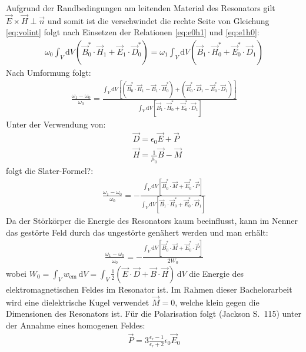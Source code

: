 \documentclass[11pt, a4paper]{scrbook}
\newcommand{\ve}{\vec{E}}
\newcommand{\vb}{\vec{B}}
\newcommand{\vh}{\vec{H}}
\newcommand{\vd}{\vec{D}}
\begin{document}
	Aufgrund der Randbedingungen am leitenden Material des Resonators gilt $\ve \times \vh \perp \vec{n}$ und somit ist die verschwindet die rechte Seite von Gleichung \eqref{eq:volint} folgt nach Einsetzen der Relationen \eqref{eq:e0h1} und \eqref{eq:e1h0}:
	\begin{align}
		\omega_0 \int_{V} \mathrm{d}V \left( \vb_0^* \cdot \vh_1 + \ve_1 \cdot \vd_0^* \right) = \omega_1 \int_{V} \mathrm{d}V \left( \vb_1 \cdot \vh_0^* + \ve_0^* \cdot \vd_1 \right)
	\end{align}
	Nach Umformung folgt:
	\begin{align}
		\frac{\omega_1 - \omega_0}{\omega_0} = \frac{\int_{V} \mathrm{d}V \left[ \left( \vb_0^* \cdot \vh_1 - \vb_1 \cdot \vh_0^* \right) + \left( \ve_0^* \cdot \vd_1 - \ve_0^* \cdot \vd_1 \right)\right]}{\int_V \mathrm{d}V \left[ \vb_1 \cdot \vh_0^* + \ve_0^* \cdot \vd_1 \right] }
	\end{align}
	Unter der Verwendung von:
	\begin{subequations}
		\begin{align}
			&\vd = \epsilon_0 \ve + \vec{P} \\
			&\vh = \frac{1}{\mu_0} \vb - \vec{M}
		\end{align}
	\end{subequations}
	folgt die Slater-Formel?:
	\begin{align}
		\frac{\omega_1 - \omega_0}{\omega_0} = - \frac{\int_V \mathrm{d}V \left[ \vb_0^* \cdot \vec{M} + \ve_0^* \cdot \vec{P} \right]}{\int_V \mathrm{d}V \left[ \vb_1 \cdot \vh_0^* + \ve_0^* \cdot \vd_1 \right]}
	\end{align}
	Da der Störkörper die Energie des Resonators kaum beeinflusst, kann im Nenner das gestörte Feld durch das ungestörte genähert werden und man erhält:
	\begin{align}
		\frac{\omega_1 - \omega_0}{\omega_0} = - \frac{\int_V \mathrm{d}V \left[ \vb_0^* \cdot \vec{M} + \ve_0^* \cdot \vec{P} \right]}{2 W_0}
	\end{align}
	wobei $W_0 = \int_V w_\mathrm{em} \, \mathrm{d}V = \int_V \frac{1}{2} (\ve \cdot \vd + \vb \cdot \vh) \, \mathrm{d}V$ die Energie des elektromagnetischen Feldes im Resonator ist.
	Im Rahmen dieser Bachelorarbeit wird eine dielektrische Kugel verwendet $\vec{M} = 0$, welche klein gegen die Dimensionen des Resonators ist. Für die Polarisation folgt (Jackson S.\ 115) unter der Annahme eines homogenen Feldes:
	\begin{align}
		\vec{P} = 3 \frac{\epsilon_\mathrm{r} - 1}{\epsilon_\mathrm{r} + 2} \epsilon_0 \ve_0
	\end{align}
\end{document}
